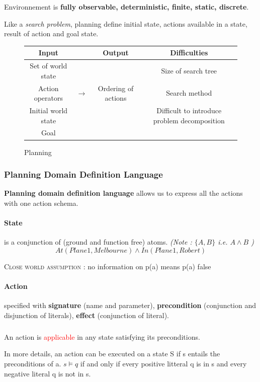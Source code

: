 Environnement is \textbf{fully observable, deterministic, finite, static, discrete}.

Like a \textit{search problem}, planning define initial state, actions available in a state,
result of action and goal state.

\begin{figure}[h]
    \centering
\begin{tabular}{ccc|c}
    Input && Output & Difficulties \\
    \hline
        Set of world state &&& Size of search tree \\
        Action operators &$\to$& Ordering of actions & Search method\\
        Initial world state &&& Difficult to introduce problem decomposition \\
        Goal && \\
\end{tabular}
\caption{Planning}
\end{figure}

\subsubsection{Planning Domain Definition Language}

\textbf{Planning domain  definition language}  allows us to  express all
the actions with one action schema.

\paragraph{\textbf{State}} is a conjunction of (ground and function free) atoms. 
\textit{(Note : $\{A, B\}$ i.e. $A \wedge B$ )}
$$ At(Plane1, Melbourne) \wedge In(Plane1, Robert) $$

\textsc{Close world assumption :} no information on p(a) means p(a) false

\paragraph{\textbf{Action}} specified with \textbf{signature} (name and parameter), 
\textbf{precondition} (conjunction and disjunction of literals),
\textbf{effect} (conjunction of literal).

\subparagraph{ } An action is \textcolor{red}{applicable} in any state
satisfying its preconditions.

In more details, an action can be executed on a state S if s entails the
preconditions of a. $s \models q$ if and only if every positive litteral q
is in s and every negative literal q is not in s.


